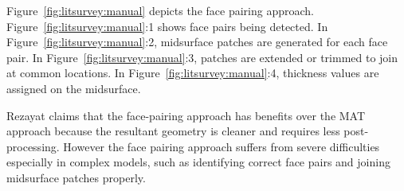 
Figure~\ref{fig:litsurvey:manual} depicts the face pairing approach. Figure~\ref{fig:litsurvey:manual}:1  shows face pairs being detected. In Figure~\ref{fig:litsurvey:manual}:2, midsurface patches are generated for each face pair. In Figure~\ref{fig:litsurvey:manual}:3, patches are extended or trimmed to join at common locations. In Figure~\ref{fig:litsurvey:manual}:4, thickness values are assigned on the midsurface.


	
Rezayat claims that the face-pairing approach has benefits over the MAT approach because the resultant geometry is cleaner and requires less post-processing. However the face pairing approach suffers from severe difficulties especially in complex models, such as identifying correct face pairs and joining midsurface patches properly.
	



